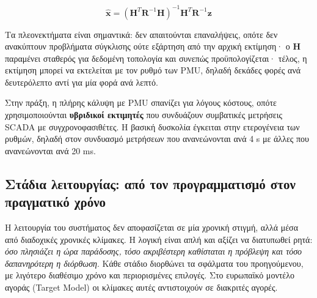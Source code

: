 \begin{equation}
\hat{\mathbf{x}} = \left(\mathbf{H}^{T}\mathbf{R}^{-1}\mathbf{H}\right)^{-1}
                    \mathbf{H}^{T}\mathbf{R}^{-1}\mathbf{z}
\label{eq:linse}
\end{equation}

Τα πλεονεκτήματα είναι σημαντικά: δεν απαιτούνται επαναλήψεις, οπότε δεν ανακύπτουν
προβλήματα σύγκλισης ούτε εξάρτηση από την αρχική εκτίμηση· ο $\mathbf{H}$ παραμένει
σταθερός για δεδομένη τοπολογία και συνεπώς προϋπολογίζεται· τέλος, η εκτίμηση μπορεί να
εκτελείται με τον ρυθμό των PMU, δηλαδή δεκάδες φορές ανά δευτερόλεπτο αντί για μία φορά
ανά λεπτό.

Στην πράξη, η πλήρης κάλυψη με PMU σπανίζει για λόγους κόστους, οπότε χρησιμοποιούνται
\textbf{υβριδικοί εκτιμητές} που συνδυάζουν συμβατικές μετρήσεις SCADA με
συγχρονοφασιθέτες. Η βασική δυσκολία έγκειται στην ετερογένεια των ρυθμών, δηλαδή στον
συνδυασμό μετρήσεων που ανανεώνονται ανά 4 s με άλλες που ανανεώνονται ανά 20 ms.

\subsection{Στάδια λειτουργίας: από τον προγραμματισμό στον πραγματικό χρόνο}

Η λειτουργία του συστήματος δεν αποφασίζεται σε μία χρονική στιγμή, αλλά μέσα από
διαδοχικές χρονικές κλίμακες. Η λογική είναι απλή και αξίζει να διατυπωθεί ρητά: \emph{όσο
πλησιάζει η ώρα παράδοσης, τόσο ακριβέστερη καθίσταται η πρόβλεψη και τόσο δαπανηρότερη η
διόρθωση}. Κάθε στάδιο διορθώνει τα σφάλματα του προηγούμενου, με λιγότερο διαθέσιμο χρόνο
και περιορισμένες επιλογές. Στο ευρωπαϊκό μοντέλο αγοράς (Target Model) οι κλίμακες αυτές
αντιστοιχούν σε διακριτές αγορές.

